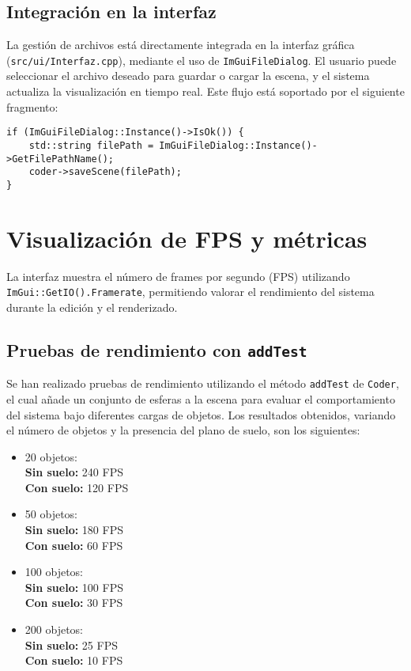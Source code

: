 \subsection{Integración en la interfaz}

La gestión de archivos está directamente integrada en la interfaz gráfica
(\texttt{src/ui/Interfaz.cpp}), mediante el uso de \texttt{ImGuiFileDialog}. El
usuario puede seleccionar el archivo deseado para guardar o cargar la escena, y
el sistema actualiza la visualización en tiempo real. Este flujo está soportado
por el siguiente fragmento:

\begin{verbatim}
if (ImGuiFileDialog::Instance()->IsOk()) {
    std::string filePath = ImGuiFileDialog::Instance()->GetFilePathName();
    coder->saveScene(filePath);
}
\end{verbatim}


\section{Visualización de FPS y métricas}

La interfaz muestra el número de frames por segundo (FPS) utilizando
\texttt{ImGui::GetIO().Framerate}, permitiendo valorar el rendimiento del
sistema durante la edición y el renderizado.

\subsection{Pruebas de rendimiento con \texttt{addTest}}

Se han realizado pruebas de rendimiento utilizando el método \texttt{addTest} de
\texttt{Coder}, el cual añade un conjunto de esferas a la escena para evaluar
el comportamiento del sistema bajo diferentes cargas de objetos. Los resultados
obtenidos, variando el número de objetos y la presencia del plano de suelo, son
los siguientes:

\begin{itemize}
    \item 20 objetos: \\
        \textbf{Sin suelo:} 240 FPS \\
        \textbf{Con suelo:} 120 FPS
    \item 50 objetos: \\
        \textbf{Sin suelo:} 180 FPS \\
        \textbf{Con suelo:} 60 FPS
    \item 100 objetos: \\
        \textbf{Sin suelo:} 100 FPS \\
        \textbf{Con suelo:} 30 FPS
    \item 200 objetos: \\
        \textbf{Sin suelo:} 25 FPS \\
        \textbf{Con suelo:} 10 FPS
\end{itemize}

